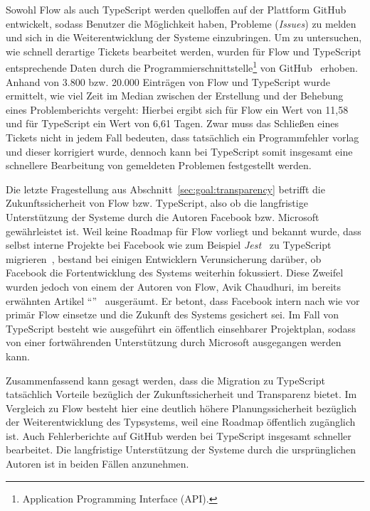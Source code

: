 Sowohl Flow als auch TypeScript werden quelloffen auf der Plattform GitHub entwickelt, \linebreak sodass Benutzer die Möglichkeit haben, Probleme (\textit{Issues}) zu melden und sich in die Weiterentwicklung der Systeme einzubringen. Um zu untersuchen, wie schnell derartige Tickets bearbeitet werden, wurden für Flow und TypeScript entsprechende Daten durch die Programmierschnittstelle\footnote{Application Programming Interface (API).} von GitHub~\autocite{GITHUB:API} erhoben. Anhand von 3.800 bzw. 20.000 Einträgen von Flow und TypeScript wurde ermittelt, wie viel Zeit im Median zwischen der Erstellung und der Behebung eines Problemberichts vergeht: Hierbei ergibt sich für Flow ein Wert von 11,58 und für TypeScript ein Wert von 6,61 Tagen. Zwar muss das Schließen eines Tickets nicht in jedem Fall bedeuten, dass tatsächlich ein Programmfehler vorlag und dieser korrigiert wurde, dennoch kann bei TypeScript somit insgesamt eine schnellere Bearbeitung von gemeldeten Problemen festgestellt werden.

Die letzte Fragestellung aus Abschnitt~\ref{sec:goal:transparency} betrifft die Zukunftssicherheit von Flow bzw. TypeScript, also ob die langfristige Unterstützung der Systeme durch die Autoren Facebook bzw. Microsoft gewährleistet ist. Weil keine Roadmap für Flow vorliegt und bekannt wurde, dass selbst interne Projekte bei Facebook wie zum Beispiel \textit{Jest}~\autocite{SOFTWARE:JEST} zu TypeScript migrieren~\autocite{JEST_TS}, bestand bei einigen Entwicklern Verunsicherung darüber, ob Facebook die Fortentwicklung des Systems weiterhin fokussiert. Diese Zweifel wurden jedoch von einem der Autoren von Flow, Avik Chaudhuri, im bereits erwähnten Artikel \enquote{}~\autocite{FLOW:UPDATE_2019} ausgeräumt. Er betont, dass Facebook intern nach wie vor primär Flow einsetze und die Zukunft des Systems gesichert sei. Im Fall von TypeScript besteht wie ausgeführt ein öffentlich einsehbarer Projektplan, sodass von einer fortwährenden Unterstützung durch Microsoft ausgegangen werden kann.

Zusammenfassend kann gesagt werden, dass die Migration zu TypeScript tatsächlich Vorteile bezüglich der Zukunftssicherheit und Transparenz bietet. Im Vergleich zu Flow besteht hier eine deutlich höhere Planungssicherheit bezüglich der Weiterentwicklung des Typsystems, weil eine Roadmap öffentlich zugänglich ist. Auch Fehlerberichte auf GitHub werden bei TypeScript insgesamt schneller bearbeitet. Die langfristige Unterstützung der Systeme durch die ursprünglichen Autoren ist in beiden Fällen anzunehmen.

